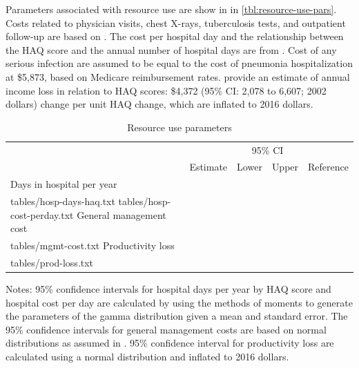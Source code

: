 \documentclass[11pt,final,fleqn]{article}\usepackage[]{graphicx}\usepackage[]{color}
\makeatletter
\theoremstyle{plain}
\newcommand*\ExpandableInput[1]{\@@input#1 }
\makeatother
\begin{document}
Parameters associated with resource use are show in in \autoref{tbl:resource-use-pars}. Costs related to physician visits, chest X-rays, tuberculosis tests, and outpatient follow-up are based on \citet{claxton2016economic}. The cost per hospital day and the relationship between the HAQ score and the annual number of hospital days are from \citet{carlson2015economic}. Cost of any serious infection are assumed to be equal to the cost of pneumonia hospitalization at \$5,873, based on Medicare reimbursement rates. \citet{wolfe2005household} provide an estimate of annual income loss in relation to HAQ scores: \$4,372 (95\% CI: 2,078 to 6,607; 2002 dollars) change per unit HAQ change, which are inflated to 2016 dollars.



\begin{table}[H]
\begin{center}
\begin{threeparttable}
\caption{Resource use parameters} \label{tbl:resource-use-pars}
\footnotesize
\begin{tabularx}{\textwidth}{@{\extracolsep{\fill}}lcccc}
\hline
\multicolumn{2}{l}{} & \multicolumn{2}{c}{95\% CI} & \multicolumn{1}{l}{} \\
\cmidrule{3-4} 
\multicolumn{1}{l}{} & \multicolumn{1}{l}{Estimate} & \multicolumn{1}{c}{Lower} & \multicolumn{1}{c}{Upper} & \multicolumn{1}{c}{Reference} \\
\hline
Days in hospital per year \\
\ExpandableInput{tables/hosp-days-haq.txt}
\ExpandableInput{tables/hosp-cost-perday.txt}
General management cost \\
\ExpandableInput{tables/mgmt-cost.txt}
Productivity loss \\
\ExpandableInput{tables/prod-loss.txt}
\hline
\end{tabularx}
\scriptsize
Notes: 95\% confidence intervals for hospital days per year by HAQ score and hospital cost per day are calculated by using the methods of moments to generate the parameters of the gamma distribution given a mean and standard error. The 95\% confidence intervals for general management costs are based on normal distributions as assumed in \citet{claxton2016economic}. 95\% confidence interval for productivity loss are calculated using a normal distribution and inflated to 2016 dollars. 
\end{threeparttable}
\end{center}
\end{table}
\end{document}
